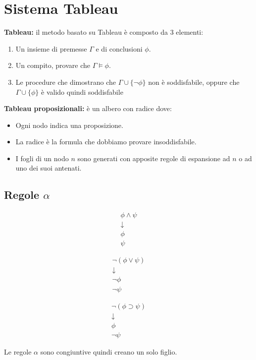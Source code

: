 \documentclass[../main.tex]{subfiles}
\begin{document}
    \section{Sistema Tableau}
    \textbf{Tableau:} il metodo basato su Tableau è composto da 3 elementi:
    \begin{enumerate}
        \item Un insieme di premesse $\Gamma$ e di conclusioni $\phi$.
        \item Un compito, provare che $\Gamma \models \phi$.
        \item Le procedure che dimostrano che $\Gamma \cup \{\lnot \phi\}$ non è soddisfabile, oppure che $\Gamma \cup \{\phi\}$ è valido quindi soddisfabile
    \end{enumerate}
    \textbf{Tableau proposizionali:} è un albero con radice dove:
    \begin{itemize}
        \item Ogni nodo indica una proposizione.
        \item La radice è la formula che dobbiamo provare insoddisfabile.
        \item I fogli di un nodo $n$ sono generati con apposite regole di espansione ad $n$ o ad uno dei suoi antenati.
    \end{itemize}

    \subsection{Regole $\alpha$}
    \begin{minipage}{0.333333\textwidth}
        \begin{gather*}
            \phi \land \psi\\
            \downarrow\\
            \phi\\
            \psi
        \end{gather*}
    \end{minipage}
    \begin{minipage}{0.333333\textwidth}
        \begin{gather*}
            \lnot (\phi \lor \psi)\\
            \downarrow\\
            \lnot \phi\\
            \lnot \psi
        \end{gather*}
    \end{minipage}
    \begin{minipage}{0.333333\textwidth}
        \begin{gather*}
            \lnot (\phi \supset \psi)\\
            \downarrow\\
            \phi\\
            \lnot \psi
        \end{gather*}
    \end{minipage}
    Le regole $\alpha$ sono congiuntive quindi creano un solo figlio.
\end{document}
